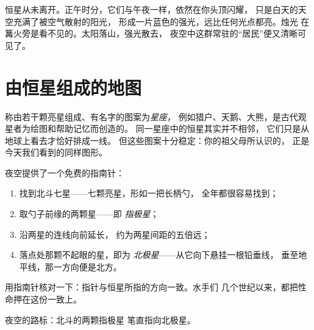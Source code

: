 \begin{remark}[恒星白天去了哪里]\label{rem:g5:stars-night-sky:daytime}
恒星从未离开。正午时分，它们与午夜一样，依然在你头顶闪耀，
只是白天的天空充满了被空气散射的阳光，
形成一片蓝色的强光，远比任何光点都亮。烛光
在篝火旁是看不见的。太阳落山，强光散去，
夜空中这群常驻的“居民”便又清晰可见了。
\end{remark}

\section{由恒星组成的地图}

\begin{definition}[星座]\label{def:g5:stars-night-sky:constellation}
称由若干颗亮星组成、有名字的图案为\emph{星座}，
例如猎户、天鹅、大熊，是古代观星者为绘图和帮助记忆而创造的。
同一星座中的恒星其实并不相邻，
它们只是从地球上看去才恰好排成一线。
但这些图案十分稳定：你的祖父母所认识的，
正是今天我们看到的同样图形。
\end{definition}

\begin{method}[寻找北极星]\label{met:g5:stars-night-sky:northstar}
夜空提供了一个免费的指南针：
\begin{enumerate}
  \item 找到北斗七星——七颗亮星，形如一把长柄勺，
        全年都很容易找到；
  \item 取勺子前缘的两颗星——即
        \emph{指极星}；
  \item 沿两星的连线向前延长，
        约为两星间距的五倍远；
  \item 落点处那颗不起眼的星，即为
        \emph{北极星}——从它向下悬挂一根铅垂线，
        垂至地平线，那一方向便是北方。
\end{enumerate}
用指南针核对一下：指针与恒星所指的方向一致。水手们
几个世纪以来，都把性命押在这份一致上。
\end{method}

\begin{omfigure}

{\small 夜空的路标：北斗的两颗指极星
笔直指向北极星。}
\end{omfigure}


